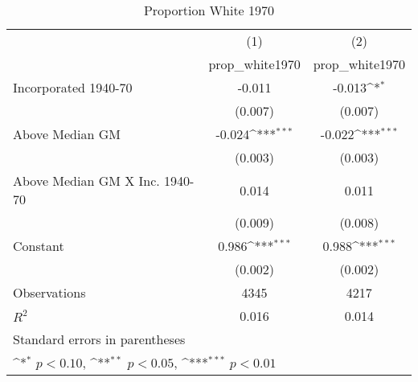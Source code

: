 \begin{table}[htbp]\centering
\def\sym#1{\ifmmode^{#1}\else\(^{#1}\)\fi}
\caption{Proportion White 1970}
\begin{tabular}{l*{2}{c}}
\hline\hline
                    &\multicolumn{1}{c}{(1)}&\multicolumn{1}{c}{(2)}\\
                    &\multicolumn{1}{c}{prop\_white1970}&\multicolumn{1}{c}{prop\_white1970}\\
\hline
Incorporated 1940-70&      -0.011         &      -0.013\sym{*}  \\
                    &     (0.007)         &     (0.007)         \\
[1em]
Above Median GM     &      -0.024\sym{***}&      -0.022\sym{***}\\
                    &     (0.003)         &     (0.003)         \\
[1em]
Above Median GM X Inc. 1940-70&       0.014         &       0.011         \\
                    &     (0.009)         &     (0.008)         \\
[1em]
Constant            &       0.986\sym{***}&       0.988\sym{***}\\
                    &     (0.002)         &     (0.002)         \\
\hline
Observations        &        4345         &        4217         \\
\(R^{2}\)           &       0.016         &       0.014         \\
\hline\hline
\multicolumn{3}{l}{\footnotesize Standard errors in parentheses}\\
\multicolumn{3}{l}{\footnotesize \sym{*} \(p<0.10\), \sym{**} \(p<0.05\), \sym{***} \(p<0.01\)}\\
\end{tabular}
\end{table}
